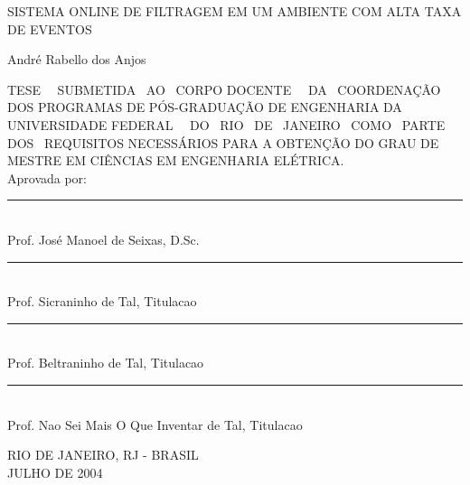 \begin{titlepage}
\begin{center}
{ SISTEMA ONLINE DE FILTRAGEM EM UM AMBIENTE COM ALTA TAXA DE EVENTOS }

\vspace*{1.0cm}
{André Rabello dos Anjos}
\end{center}
\vspace*{1.0cm}

{ \noindent 
TESE~~ SUBMETIDA~ AO~ CORPO DOCENTE~~ DA~ COORDENAÇÃO~ DOS
PROGRAMAS DE PÓS-GRADUAÇÃO DE ENGENHARIA DA \mbox{UNIVERSIDADE} FEDERAL~~ DO~
RIO~ DE~ JANEIRO~ COMO~ PARTE~ DOS~ REQUISITOS \mbox{NECESSÁRIOS} PARA A
OBTENÇÃO DO GRAU DE MESTRE EM CIÊNCIAS EM ENGENHARIA ELÉTRICA. }  \\

\noindent Aprovada por:
\vspace{1.0cm} %

\begin{flushright}
\parbox{10cm}
{
\begin{center}

\rule{10cm}{.02cm} \\
Prof. José Manoel de Seixas, D.Sc. \\
\vspace{.30in}

\rule{10cm}{.02cm} \\
Prof. Sicraninho de Tal, Titulacao \\
\vspace{.30in}

\rule{10cm}{.02cm} \\
Prof. Beltraninho de Tal, Titulacao \\
\vspace{.30in}

\rule{10cm}{.02cm} \\
Prof. Nao Sei Mais O Que Inventar de Tal, Titulacao \\
\vspace{.30in}

\end{center}
}
\end{flushright}
\vspace{-.5cm}

\vfill
\begin{center}
RIO DE JANEIRO, RJ - BRASIL \\
JULHO DE 2004
\end{center}

\end{titlepage}

